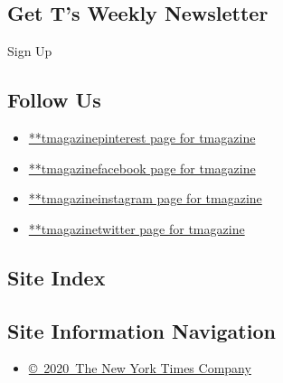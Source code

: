 \hypertarget{get-ts-weekly-newsletter}{%
\subsection{Get T's Weekly Newsletter}\label{get-ts-weekly-newsletter}}

Sign Up

\hypertarget{follow-us}{%
\subsection{Follow Us}\label{follow-us}}

\begin{itemize}
\tightlist
\item
  \href{https://pinterest.com/tmagazine}{**tmagazinepinterest page for
  tmagazine}
\item
  \href{https://www.facebook.com/tmagazine}{**tmagazinefacebook page for
  tmagazine}
\item
  \href{https://instagram.com/tmagazine}{**tmagazineinstagram page for
  tmagazine}
\item
  \href{https://twitter.com/tmagazine}{**tmagazinetwitter page for
  tmagazine}
\end{itemize}

\hypertarget{site-index}{%
\subsection{Site Index}\label{site-index}}

\hypertarget{site-information-navigation}{%
\subsection{Site Information
Navigation}\label{site-information-navigation}}

\begin{itemize}
\tightlist
\item
  \href{https://help.nytimes.com/hc/en-us/articles/115014792127-Copyright-notice}{©~2020~The
  New York Times Company}
\end{itemize}

